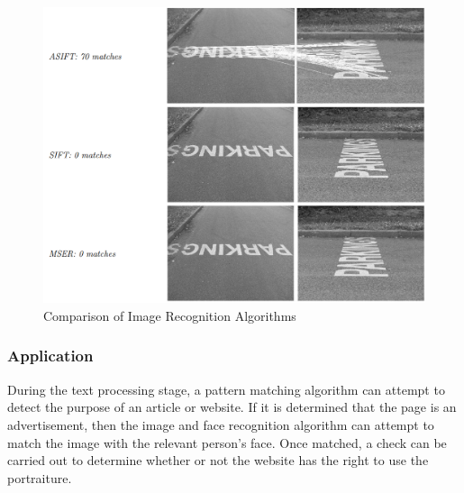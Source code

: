       \begin{figure}
        \centering
        \begin{minipage}{14cm}
          \centering
          \includegraphics[width=14cm]{inc/image_recognition_comparison.png}
          \caption{Comparison of Image Recognition Algorithms}
          \label{fig:image_recognition_comparison}
        \end{minipage}
      \end{figure}

    \subsubsection{Application}

      During the text processing stage, a pattern matching algorithm can attempt to detect the purpose of an article or website. If it is determined that the page is an advertisement, then the image and face recognition algorithm can attempt to match the image with the relevant person's face. Once matched, a check can be carried out to determine whether or not the website has the right to use the portraiture.
